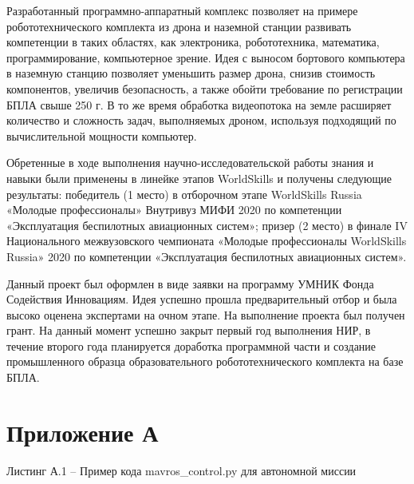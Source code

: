 \documentclass[a4paper,12pt]{article}
\begin{document}
Разработанный программно-аппаратный комплекс позволяет на примере робототехнического комплекта из дрона и наземной станции развивать компетенции в таких областях, как электроника, робототехника, математика, программирование, компьютерное зрение. Идея с выносом бортового компьютера в наземную станцию позволяет уменьшить размер дрона, снизив стоимость компонентов, увеличив безопасность, а также обойти требование по регистрации БПЛА свыше 250 г. В то же время обработка видеопотока на земле расширяет количество и сложность задач, выполняемых дроном, используя подходящий по вычислительной мощности компьютер.

Обретенные в ходе выполнения научно-исследовательской работы знания и навыки были применены в линейке этапов WorldSkills и получены следующие результаты:
победитель (1 место) в отборочном этапе WorldSkills Russia «Молодые профессионалы» Внутривуз МИФИ 2020 по компетенции «Эксплуатация беспилотных авиационных систем»; призер (2 место) в финале IV Национального межвузовского чемпионата «Молодые профессионалы WorldSkills Russia» 2020 по компетенции «Эксплуатация беспилотных авиационных систем».

Данный проект был оформлен в виде заявки на программу УМНИК Фонда Содействия Инновациям. Идея успешно прошла предварительный отбор \cite{umnik} и была высоко оценена экспертами на очном этапе. На выполнение проекта был получен грант. На данный момент успешно закрыт первый год выполнения НИР, в течение второго года планируется доработка программной части и создание промышленного образца образовательного робототехнического комплекта на базе БПЛА.
\pagebreak

\printbibliography

\pagebreak
\section*{ \centering Приложение А} 

\begin{center}
	Листинг А.1 -- Пример кода mavros\_control.py для автономной миссии
\end{center}
\end{document}
